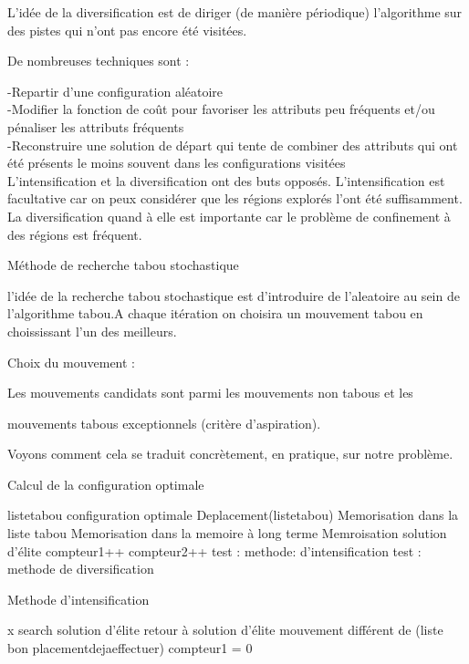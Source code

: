 \documentclass{report}
\begin{document}
L’idée de la diversification est de diriger (de manière périodique) l’algorithme sur des pistes qui n’ont pas encore été visitées.

De nombreuses techniques sont :

-Repartir d’une configuration aléatoire\\
-Modifier la fonction de coût pour favoriser les attributs peu fréquents et/ou pénaliser les attributs fréquents\\
-Reconstruire une solution de départ qui tente de combiner des attributs qui ont été présents le moins souvent dans les configurations visitées\\

L’intensification et la diversification ont des buts opposés. L’intensification est facultative
car on peux considérer que les régions explorés l’ont été suffisamment. La diversification quand à elle est importante car le problème de confinement à des régions est fréquent.


Méthode de recherche tabou stochastique

l’idée de la recherche tabou stochastique est d’introduire de l’aleatoire au sein de l’algorithme tabou.A chaque itération on choisira un mouvement tabou en choississant l'un des meilleurs.

Choix du mouvement :

Les mouvements candidats sont parmi les mouvements non tabous et les

mouvements tabous exceptionnels (critère d’aspiration).

Voyons comment cela se traduit concrètement, en pratique, sur notre problème.

\begin{algorithm}
\caption{Calcul de la configuration optimale}
\begin{algorithmic}
\REQUIRE listetabou
\ENSURE configuration optimale
\STATE Deplacement(listetabou)
\STATE Memorisation dans la liste tabou
\STATE Memorisation dans la memoire à long terme
\STATE Memroisation solution d'élite
\STATE compteur1++
\STATE compteur2++
\STATE test : methode: d'intensification
\STATE test : methode de diversification
\ENDWHILE
\end{algorithmic}
\end{algorithm}

\begin{algorithm}
\caption{Methode d'intensification}
\begin{algorithmic}
\REQUIRE x
\ENSURE 
{}
\STATE search solution d'élite
\STATE retour à solution d'élite
\STATE mouvement différent de (liste bon placementdejaeffectuer)
\STATE compteur1 = 0
\ENDIF
\end{algorithmic}
\end{algorithm}
\end{document}
